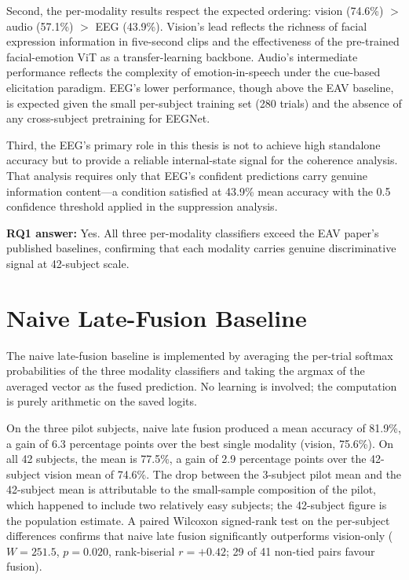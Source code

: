 Second, the per-modality results respect the expected ordering: vision (74.6\%) $>$ audio (57.1\%) $>$ EEG (43.9\%). Vision's lead reflects the richness of facial expression information in five-second clips and the effectiveness of the pre-trained facial-emotion ViT as a transfer-learning backbone. Audio's intermediate performance reflects the complexity of emotion-in-speech under the cue-based elicitation paradigm. EEG's lower performance, though above the EAV baseline, is expected given the small per-subject training set (280 trials) and the absence of any cross-subject pretraining for EEGNet.

Third, the EEG's primary role in this thesis is not to achieve high standalone accuracy but to provide a reliable internal-state signal for the coherence analysis. That analysis requires only that EEG's confident predictions carry genuine information content---a condition satisfied at 43.9\% mean accuracy with the 0.5 confidence threshold applied in the suppression analysis.

\textbf{RQ1 answer:} Yes. All three per-modality classifiers exceed the EAV paper's published baselines, confirming that each modality carries genuine discriminative signal at 42-subject scale.

\section{Naive Late-Fusion Baseline}
\label{sec:naive_late_fusion_results}

The naive late-fusion baseline is implemented by averaging the per-trial softmax probabilities of the three modality classifiers and taking the argmax of the averaged vector as the fused prediction. No learning is involved; the computation is purely arithmetic on the saved logits.

On the three pilot subjects, naive late fusion produced a mean accuracy of 81.9\%, a gain of 6.3 percentage points over the best single modality (vision, 75.6\%). On all 42 subjects, the mean is 77.5\%, a gain of 2.9 percentage points over the 42-subject vision mean of 74.6\%. The drop between the 3-subject pilot mean and the 42-subject mean is attributable to the small-sample composition of the pilot, which happened to include two relatively easy subjects; the 42-subject figure is the population estimate. A paired Wilcoxon signed-rank test on the per-subject differences confirms that naive late fusion significantly outperforms vision-only ($W=251.5$, $p=0.020$, rank-biserial $r=+0.42$; 29 of 41 non-tied pairs favour fusion).

